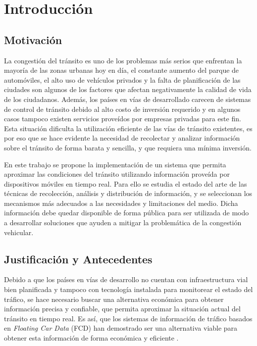 \chapter{Introducción}
\label{cap:1}

\section{Motivación}

La congestión del tránsito es uno de los problemas más serios que enfrentan la mayoría de las zonas urbanas hoy en día, el constante aumento del parque de automóviles, el alto uso de vehículos privados y la falta de planificación de las ciudades son algunos de los factores que afectan negativamente la calidad de vida de los ciudadanos. Además, los países en vías de desarrollado carecen de sistemas de control de tránsito debido al alto costo de inversión requerido y en algunos casos tampoco existen servicios proveídos por empresas privadas para este fin. Esta situación dificulta la utilización eficiente de las vías de tránsito existentes, es por eso que se hace evidente la necesidad de recolectar y analizar información sobre el tránsito de forma barata y sencilla, y que requiera una mínima inversión.

En este trabajo se propone la implementación de un sistema que permita aproximar las condiciones del tránsito utilizando información proveída por dispositivos móviles en tiempo real. Para ello se estudia el estado del arte de las técnicas de recolección, análisis y distribución de información, y se seleccionan los mecanismos más adecuados a las necesidades y limitaciones del medio. Dicha información debe quedar disponible de forma pública para ser utilizada de modo a desarrollar soluciones que ayuden a mitigar la problemática de la congestión vehicular.

\section{Justificación y Antecedentes}

Debido a que los países en vías de desarrollo no cuentan con infraestructura vial bien planificada y  tampoco con tecnología instalada para monitorear el estado del tráfico, se hace necesario buscar una alternativa económica para obtener información precisa y confiable, que permita aproximar la situación actual del tránsito en tiempo real. Es así, que los sistemas de información de tráfico basados en \emph{Floating Car Data} (FCD) han demostrado ser una alternativa viable para obtener esta información de forma económica y eficiente \cite{schafer2002traffic,reinthaler2007evaluation}.

